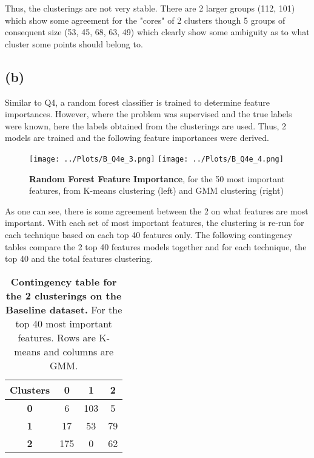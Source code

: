 \documentclass[12pt]{report} %
\begin{document}
Thus, the clusterings are not very stable. There are 2 larger groups (112, 101) which show some agreement for the "cores" of 2 clusters though 5 groups of consequent size (53, 45, 68, 63, 49) which clearly show some ambiguity as to what cluster some points should belong to. 

\subsection*{(b)}

Similar to Q4, a random forest classifier is trained to determine feature importances. However, where the problem was supervised and the true labels were known, here the labels obtained from the clusterings are used. Thus, 2 models are trained and the following feature importances were derived.

\begin{figure}[htbp]
    \centering
    \texttt{[image: ../Plots/B\_Q4e\_3.png]}
    \texttt{[image: ../Plots/B\_Q4e\_4.png]}
    \caption{\textbf{Random Forest Feature Importance}, for the 50 most important features, from K-means clustering (left) and GMM clustering (right)}
\end{figure}

As one can see, there is some agreement between the 2 on what features are most important. With each set of most important features, the clustering is re-run for each technique based on each top 40 features only. The following contingency tables compare the 2 top 40 features models together and for each technique, the top 40 and the total features clustering.

\begin{table}[h]
    \centering
    \begin{tabular}{ |c|c|c|c| }
        \hline
        \textbf{Clusters} & \textbf{0} & \textbf{1} & \textbf{2}\\ 
        \hline
        \textbf{0} & 6 & 103 & 5\\
        \hline
        \textbf{1} & 17 & 53 & 79\\
        \hline
        \textbf{2} & 175 & 0 & 62\\
        \hline
    \end{tabular}
    \caption{\textbf{Contingency table for the 2 clusterings on the Baseline dataset.} For the top 40 most important features. Rows are K-means and columns are GMM.}
\end{table}
\end{document}
